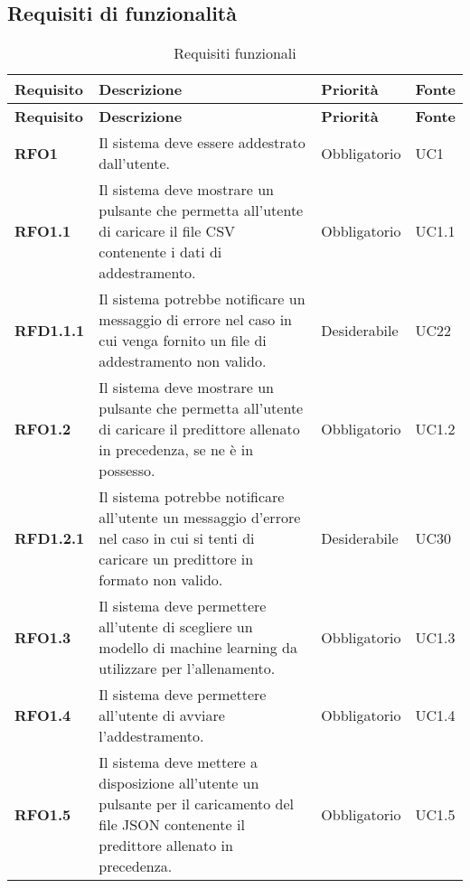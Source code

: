 \subsection{Requisiti di funzionalità}
\label{sub:requisiti_di_funzionalita}

\renewcommand{\arraystretch}{2} %
\begin{longtable}[H]{>{\centering\bfseries}m{2cm} >{\centering}m{9cm} >{\centering}m{2.5cm} >{\centering\arraybackslash}m{2.5cm}}
  \caption{Requisiti funzionali}%
  \label{tab:requisiti_funzionali}                                                    \\
  \rowcolor{lightgray}
  {\textbf{Requisito}} & {\textbf{Descrizione}} & {\textbf{Priorità}} & {\textbf{Fonte}}  \\
  \endfirsthead%
  \rowcolor{lightgray}
  {\textbf{Requisito}} & {\textbf{Descrizione}} & {\textbf{Priorità}} & {\textbf{Fonte}}  \\
  \endhead%
  \rowcolor{white}
  \multicolumn{4}{c}{\textit{Continua alla pagina successiva}}
  \endfoot%
  \endlastfoot%
  \textbf{RFO1} & Il sistema deve essere addestrato dall'utente. & Obbligatorio & UC1 \\
  \textbf{RFO1.1} & Il sistema deve mostrare un pulsante che permetta all'utente di caricare il file CSV contenente i dati di addestramento.  & Obbligatorio & UC1.1 \\
  \textbf{RFD1.1.1} & Il sistema potrebbe notificare un messaggio di errore nel caso in cui venga fornito un file di addestramento non valido. & Desiderabile & UC22 \\
  \textbf{RFO1.2} & Il sistema deve mostrare un pulsante che permetta all'utente di caricare il predittore allenato in precedenza, se ne è in possesso. & Obbligatorio & UC1.2 \\
  \textbf{RFD1.2.1} & Il sistema potrebbe notificare all'utente un messaggio d'errore nel caso in cui si tenti di caricare un predittore in formato non valido. & Desiderabile & UC30 \\
  \textbf{RFO1.3} & Il sistema deve permettere all'utente di scegliere un modello di machine learning da utilizzare per l'allenamento. & Obbligatorio & UC1.3 \\
  \textbf{RFO1.4} & Il sistema deve permettere all'utente di avviare l'addestramento. & Obbligatorio & UC1.4 \\
  \textbf{RFO1.5} & Il sistema deve mettere a disposizione all’utente un pulsante per il caricamento del file JSON contenente il predittore allenato in precedenza. & Obbligatorio & UC1.5 \\

\end{longtable}
